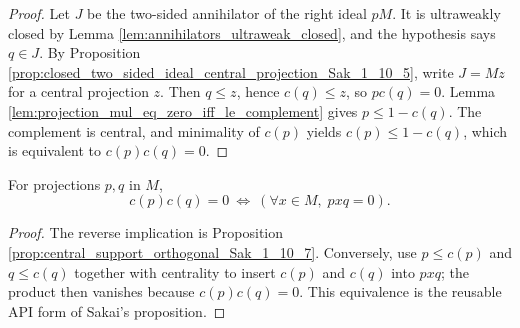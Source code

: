 \begin{proof}
  \notready
  Let $J$ be the two-sided annihilator of the right ideal $pM$.  It is ultraweakly closed by
  Lemma \ref{lem:annihilators_ultraweak_closed}, and the hypothesis says $q\in J$.  By Proposition
  \ref{prop:closed_two_sided_ideal_central_projection_Sak_1_10_5}, write $J=Mz$ for a central
  projection $z$.  Then $q\leq z$, hence $c(q)\leq z$, so $pc(q)=0$.  Lemma
  \ref{lem:projection_mul_eq_zero_iff_le_complement} gives $p\leq1-c(q)$.  The complement is
  central, and minimality of $c(p)$ yields $c(p)\leq1-c(q)$, which is equivalent to
  $c(p)c(q)=0$.
\end{proof}

\begin{corollary}
  \label{cor:central_support_orthogonal_iff}
  \notready
  For projections $p,q$ in $M$,
  \[
    c(p)c(q)=0\ \Longleftrightarrow\ (\forall x\in M,\;pxq=0).
  \]
\end{corollary}

\begin{proof}
  \notready
  The reverse implication is Proposition
  \ref{prop:central_support_orthogonal_Sak_1_10_7}.  Conversely, use $p\leq c(p)$ and
  $q\leq c(q)$ together with centrality to insert $c(p)$ and $c(q)$ into $pxq$; the product then
  vanishes because $c(p)c(q)=0$.  This equivalence is the reusable API form of Sakai's
  proposition.
\end{proof}
